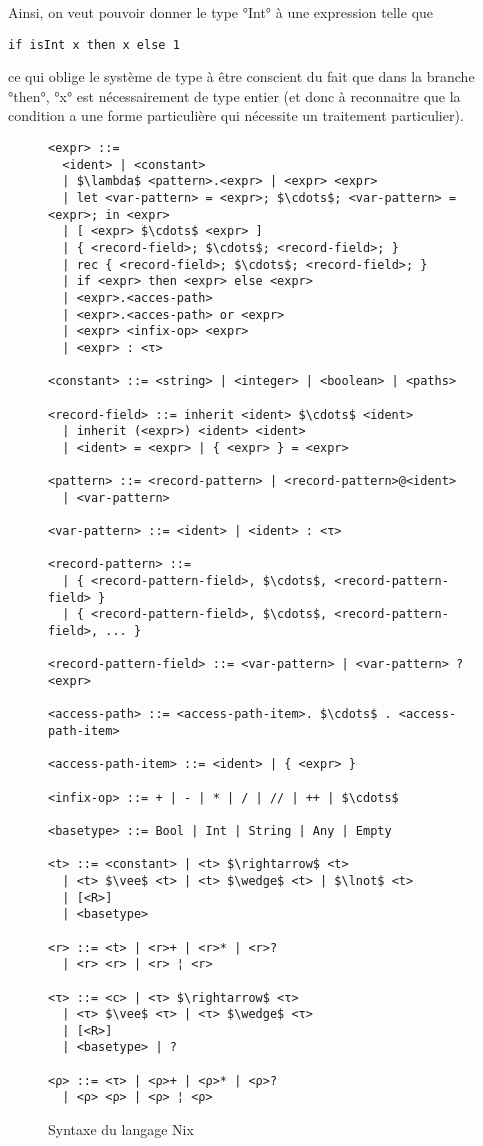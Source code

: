 Ainsi, on veut pouvoir donner le type °Int° à une expression telle que

\begin{lstlisting}
if isInt x then x else 1
\end{lstlisting}

ce qui oblige le système de type à être conscient du fait que dans la branche
°then°, °x° est nécessairement de type entier (et donc à reconnaitre que la
condition a une forme particulière qui nécessite un traitement particulier).

\begin{figure}
  \small
  \begin{lstlisting}
<expr> ::=
  <ident> | <constant>
  | $\lambda$ <pattern>.<expr> | <expr> <expr>
  | let <var-pattern> = <expr>; $\cdots$; <var-pattern> = <expr>; in <expr>
  | [ <expr> $\cdots$ <expr> ]
  | { <record-field>; $\cdots$; <record-field>; }
  | rec { <record-field>; $\cdots$; <record-field>; }
  | if <expr> then <expr> else <expr>
  | <expr>.<acces-path>
  | <expr>.<acces-path> or <expr>
  | <expr> <infix-op> <expr>
  | <expr> : <τ>

<constant> ::= <string> | <integer> | <boolean> | <paths>

<record-field> ::= inherit <ident> $\cdots$ <ident>
  | inherit (<expr>) <ident> <ident>
  | <ident> = <expr> | { <expr> } = <expr>

<pattern> ::= <record-pattern> | <record-pattern>@<ident>
  | <var-pattern>

<var-pattern> ::= <ident> | <ident> : <τ>

<record-pattern> ::=
  | { <record-pattern-field>, $\cdots$, <record-pattern-field> }
  | { <record-pattern-field>, $\cdots$, <record-pattern-field>, ... }

<record-pattern-field> ::= <var-pattern> | <var-pattern> ? <expr>

<access-path> ::= <access-path-item>. $\cdots$ . <access-path-item>

<access-path-item> ::= <ident> | { <expr> }

<infix-op> ::= + | - | * | / | // | ++ | $\cdots$

<basetype> ::= Bool | Int | String | Any | Empty

<t> ::= <constant> | <t> $\rightarrow$ <t>
  | <t> $\vee$ <t> | <t> $\wedge$ <t> | $\lnot$ <t>
  | [<R>]
  | <basetype>

<r> ::= <t> | <r>+ | <r>* | <r>?
  | <r> <r> | <r> ¦ <r>

<τ> ::= <c> | <τ> $\rightarrow$ <τ>
  | <τ> $\vee$ <τ> | <τ> $\wedge$ <τ>
  | [<R>]
  | <basetype> | ?

<ρ> ::= <τ> | <ρ>+ | <ρ>* | <ρ>?
  | <ρ> <ρ> | <ρ> ¦ <ρ>
  \end{lstlisting}
  \caption{Syntaxe du langage Nix\label{nix::syntax}}
\end{figure}


